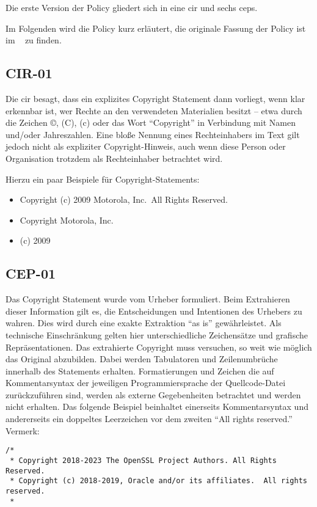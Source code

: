 Die erste Version der Policy gliedert sich in eine \gls{cir} und sechs \glspl{cep}.

Im Folgenden wird die Policy kurz erläutert, die originale Fassung der Policy ist im ~ zu finden.


\subsection{CIR-01}\label{subsec:cir-01}

Die \gls{cir} besagt, dass ein explizites Copyright Statement dann vorliegt, wenn klar erkennbar ist, wer Rechte an den verwendeten Materialien besitzt -- etwa durch die Zeichen ©, (C), (c) oder das Wort \enquote{Copyright} in Verbindung mit Namen und/oder Jahreszahlen.
Eine bloße Nennung eines Rechteinhabers im Text gilt jedoch nicht als expliziter Copyright-Hinweis, auch wenn diese Person oder Organisation trotzdem als Rechteinhaber betrachtet wird.

Hierzu ein paar Beispiele für Copyright-Statements:
\begin{itemize}
    \item Copyright (c) 2009 Motorola, Inc.\ All Rights Reserved.
    \item Copyright Motorola, Inc.
    \item (c) 2009
\end{itemize}


\subsection{CEP-01}\label{subsec:cep-01}

Das Copyright Statement wurde vom Urheber formuliert.
Beim Extrahieren dieser Information gilt es, die Entscheidungen und Intentionen des Urhebers zu wahren.
Dies wird durch eine exakte Extraktion \enquote{as is} gewährleistet.
Als technische Einschränkung gelten hier unterschiedliche Zeichensätze und grafische Repräsentationen.
Das extrahierte Copyright muss versuchen, so weit wie möglich das Original abzubilden.
Dabei werden Tabulatoren und Zeilenumbrüche innerhalb des Statements erhalten.
Formatierungen und Zeichen die auf Kommentarsyntax der jeweiligen Programmiersprache der Quellcode-Datei zurückzuführen sind, werden als externe Gegebenheiten betrachtet und werden nicht erhalten.
Das folgende Beispiel beinhaltet einerseits Kommentarsyntax und andererseits ein doppeltes Leerzeichen vor dem zweiten \enquote{All rights reserved.} Vermerk:
\begin{lstlisting}[numbers=none, keepspaces=true]
/*
 * Copyright 2018-2023 The OpenSSL Project Authors. All Rights Reserved.
 * Copyright (c) 2018-2019, Oracle and/or its affiliates.  All rights reserved.
 *
\end{lstlisting}

